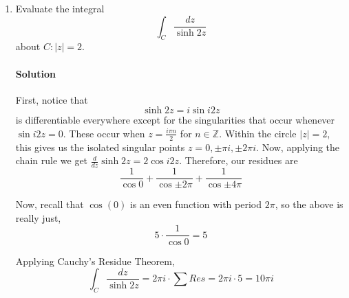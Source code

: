\documentclass[11pt]{article}
\begin{document}
\begin{enumerate}
\begin{proof}
		Because $\cos$ is an even function, and $\sin$ is an odd function, this simplifies to $-2\cos{\pi t}$ as we set out to prove.
	\end{proof}
			
	\item Evaluate the integral
	\[ \int_C \frac{dz}{\sinh{2z}} \]
	about $C: |z| = 2$.
	
	\paragraph{Solution} First, notice that 
	\[\sinh{2z} = i \sin{i 2z} \]
	is differentiable everywhere except for the singularities that occur whenever $\sin{i 2z} = 0$. These occur when $z = \frac{i \pi n}{2}$ for $n \in \mathbb{Z}$. Within the circle $|z| = 2$, this gives us the isolated singular points
	$z = 0, \pm \pi i, \pm 2 \pi i$. Now, applying the chain rule we get $\frac{d}{dz} \sinh{2z} = 2\cos{i 2z}$. Therefore, our residues are
	\[\frac{1}{ \cos{0} } + \frac{1}{ \cos{\pm 2\pi}} + \frac{1}{ \cos{\pm 4\pi}} \]
	
	Now, recall that $\cos(0)$ is an even function with period $2\pi$, so the above is really just,
	\[5 \cdot \frac{1}{ \cos{0} } = 5 \]
	
	Applying Cauchy's Residue Theorem,
	\[\int_C \frac{dz}{\sinh{2z}} = 2\pi i \cdot \sum Res = 2\pi i \cdot 5 = 
	  10\pi i\]
\end{enumerate}
\end{document}
